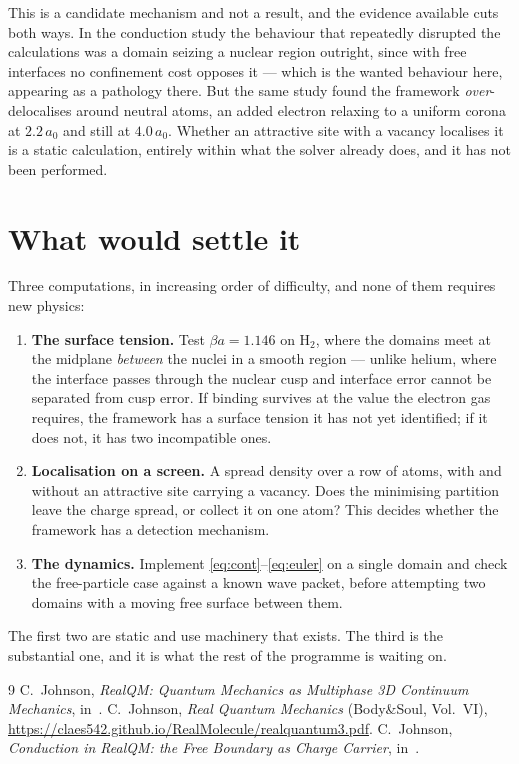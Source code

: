 \documentclass[11pt]{article}
\begin{document}
This is a candidate mechanism and not a result, and the evidence available cuts both ways. In the
conduction study the behaviour that repeatedly disrupted the calculations was a domain seizing a
nuclear region outright, since with free interfaces no confinement cost opposes it --- which is the
wanted behaviour here, appearing as a pathology there. But the same study found the framework
\emph{over}-delocalises around neutral atoms, an added electron relaxing to a uniform corona at
$2.2\,a_0$ and still at $4.0\,a_0$. Whether an attractive site with a vacancy localises it is a
static calculation, entirely within what the solver already does, and it has not been performed.

\section{What would settle it}

Three computations, in increasing order of difficulty, and none of them requires new physics:

\begin{enumerate}
\item \textbf{The surface tension.} Test $\beta a=1.146$ on $\mathrm{H_2}$, where the domains meet at
the midplane \emph{between} the nuclei in a smooth region --- unlike helium, where the interface
passes through the nuclear cusp and interface error cannot be separated from cusp error. If binding
survives at the value the electron gas requires, the framework has a surface tension it has not yet
identified; if it does not, it has two incompatible ones.
\item \textbf{Localisation on a screen.} A spread density over a row of atoms, with and without an
attractive site carrying a vacancy. Does the minimising partition leave the charge spread, or collect
it on one atom? This decides whether the framework has a detection mechanism.
\item \textbf{The dynamics.} Implement \eqref{eq:cont}--\eqref{eq:euler} on a single domain and check
the free-particle case against a known wave packet, before attempting two domains with a moving free
surface between them.
\end{enumerate}

\noindent The first two are static and use machinery that exists. The third is the substantial one,
and it is what the rest of the programme is waiting on.

\begin{thebibliography}{9}
 C.\ Johnson, \emph{RealQM: Quantum Mechanics as Multiphase 3D Continuum Mechanics},
in~\cite{realqmbook}.
 C.\ Johnson, \emph{Real Quantum Mechanics} (Body\&Soul, Vol.\ VI),
\url{https://claes542.github.io/RealMolecule/realquantum3.pdf}.
 C.\ Johnson, \emph{Conduction in RealQM: the Free Boundary as Charge Carrier},
in~\cite{realqmbook}.
\end{thebibliography}
\end{document}
